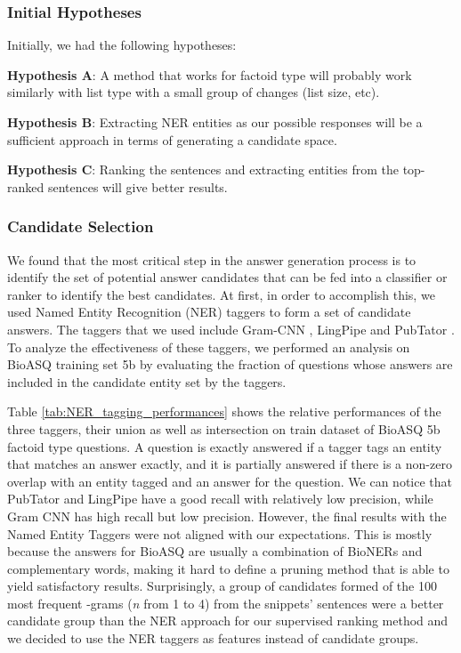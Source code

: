 \subsubsection{Initial Hypotheses}


Initially, we had the following hypotheses:

\bigbreak

\textbf{Hypothesis A}: A method that works for factoid type will probably work similarly with list type with a small group of changes (list size, etc). 

\bigbreak 

\textbf{Hypothesis B}: Extracting NER entities as our possible responses will be a sufficient approach in terms of generating a candidate space.

\bigbreak 

\textbf{Hypothesis C}: Ranking the sentences and extracting entities from the top-ranked sentences will give better results.

\subsubsection{Candidate Selection}

We found that the most critical step in the answer generation process is to identify the set of potential answer candidates that can be fed into a classifier or ranker to identify the best candidates. At first, in order to accomplish this, we used Named Entity Recognition (NER) taggers to form a set of candidate answers. The taggers that we used include Gram-CNN \cite{gram-cnn}, LingPipe\cite{lingpipe} and PubTator \cite{pubtator}. To analyze the effectiveness of these taggers, we performed an analysis on BioASQ training set 5b by evaluating the fraction of questions whose answers are included in the candidate entity set by the taggers.

Table \ref{tab:NER_tagging_performances} shows the relative performances of the three taggers, their union as well as intersection on train dataset of BioASQ 5b factoid type questions. A question is exactly answered if a tagger tags an entity that matches an answer exactly, and it is partially answered if there is a non-zero overlap with an entity tagged and an answer for the question. We can notice that PubTator and LingPipe have a good recall with relatively low precision, while Gram CNN has high recall but low precision. However, the final results with the Named Entity Taggers were not aligned with our expectations. This is mostly because the answers for BioASQ are usually a combination of BioNERs and complementary words, making it hard to define a pruning method that is able to yield satisfactory results. Surprisingly, a group of candidates formed of the 100 most frequent -grams (\textit{n} from 1 to 4) from the snippets' sentences were a better candidate group than the NER approach for our supervised ranking method and we decided to use the NER taggers as features instead of candidate groups.



